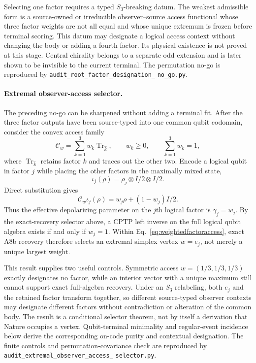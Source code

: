 Selecting one factor requires a typed $S_3$-breaking datum. The weakest
admissible form is a source-owned or irreducible observer--source access
functional whose three factor weights are not all equal and whose unique
extremum is frozen before terminal scoring. This datum may designate a
logical access context without changing the body or adding a fourth factor.
Its physical existence is not proved at this stage. Central chirality belongs
to a separate odd extension and is later shown to be invisible to the current
terminal. The permutation no-go is reproduced by
\texttt{audit\_root\_factor\_designation\_}\allowbreak
\texttt{no\_go.py}.

\paragraph{Extremal observer-access selector.}
The preceding no-go can be sharpened without adding a terminal fit. After the
three factor outputs have been source-typed into one common qubit codomain,
consider the convex access family
\begin{equation}
 \mathcal C_w=\sum_{k=1}^{3}w_k\operatorname{Tr}_{\widehat{k}},
 \qquad w_k\geq0,\qquad \sum_{k=1}^{3}w_k=1,
 \label{eq:weightedfactoraccess}
\end{equation}
where $\operatorname{Tr}_{\widehat{k}}$ retains factor $k$ and traces out the
other two. Encode a logical qubit in factor $j$ while placing the other
factors in the maximally mixed state,
\begin{equation}
 \iota_j(\rho)=\rho_j\otimes I/2\otimes I/2.
\end{equation}
Direct substitution gives
\begin{equation}
 \mathcal C_w\iota_j(\rho)
 =w_j\rho+(1-w_j)I/2.
 \label{eq:accessdepolarizing}
\end{equation}
Thus the effective depolarizing parameter on the $j$th logical factor is
$\gamma_j=w_j$. By the exact-recovery selector above, a CPTP left inverse on
the full logical qubit algebra exists if and only if $w_j=1$. Within
Eq.~\eqref{eq:weightedfactoraccess}, exact A8b recovery therefore selects an
extremal simplex vertex $w=e_j$, not merely a unique largest weight.

This result supplies two useful controls. Symmetric access
$w=(1/3,1/3,1/3)$ exactly designates no factor, while an interior vector with
a unique maximum still cannot support exact full-algebra recovery. Under an
$S_3$ relabeling, both $e_j$ and the retained factor transform together, so
different source-typed observer contexts may designate different factors
without contradiction or alteration of the common body. The result is a
conditional selector theorem, not by itself a derivation that Nature occupies
a vertex. Qubit-terminal minimality and regular-event incidence below derive
the corresponding on-code purity and contextual designation. The finite controls and
permutation-covariance check are reproduced by
\texttt{audit\_extremal\_observer\_access\_}\allowbreak
\texttt{selector.py}.

